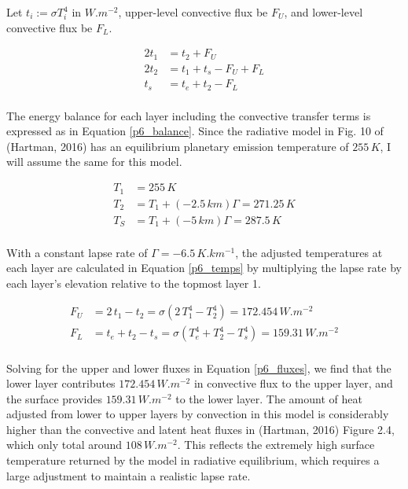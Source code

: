 \documentclass[12pt]{article}
\begin{document}
\noindent
Let $t_i := \sigma T_i^4$ in $\si{W.m^{-2}}$, upper-level convective flux be $F_U$, and lower-level convective flux be $F_L$.

\begin{equation}
    \begin{split}\label{p6_balance}
        2t_1 &= t_2 + F_U \\
        2t_2 &= t_1 + t_s - F_U + F_L \\
        t_s &= t_e + t_2 - F_L \\
    \end{split}
\end{equation}

The energy balance for each layer including the convective transfer terms is expressed as in Equation \ref{p6_balance}.
Since the radiative model in Fig. 10 of (Hartman, 2016) has an equilibrium planetary emission temperature of $255\,\si{K}$,
I will assume the same for this model.

\begin{equation}\label{p6_temps}
    \begin{split}
        T_1 &= 255 \,\si{K} \\
        T_2 &= T_1 + (-2.5\,\si{km})\Gamma =  271.25 \,\si{K} \\
        T_S &= T_1 + (-5\,\si{km})\Gamma = 287.5 \,\si{K} \\
    \end{split}
\end{equation}

With a constant lapse rate of $\Gamma = -6.5\,\si{K.km^{-1}}$, the adjusted temperatures at each layer are calculated in Equation \ref{p6_temps}
by multiplying the lapse rate by each layer's elevation relative to the topmost layer 1.

\begin{equation}\label{p6_fluxes}
    \begin{split}
        F_U &= 2\,t_1 - t_2 = \sigma(2\,T_1^4-T_2^4) = 172.454\,\si{W.m^{-2}} \\
        F_L &= t_e + t_2 - t_s = \sigma(T_e^4 + T_2^4 -T_s^4) = 159.31\,\si{W.m^{-2}} \\
    \end{split}
\end{equation}

Solving for the upper and lower fluxes in Equation \ref{p6_fluxes}, we find that the lower layer contributes $172.454\,\si{W.m^{-2}}$ in convective flux to the upper layer,
and the surface provides $159.31\,\si{W.m^{-2}}$  to the lower layer. The amount of heat adjusted from lower to upper layers by convection in this model is considerably
higher than the convective and latent heat fluxes in (Hartman, 2016) Figure 2.4, which only total around $108\,\si{W.m^{-2}}$. This reflects the extremely high surface
temperature returned by the model in radiative equilibrium, which requires a large adjustment to maintain a realistic lapse rate.
\end{document}
